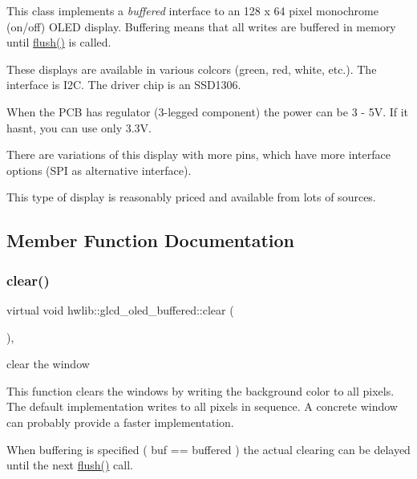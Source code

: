 This class implements a {\itshape buffered} interface to an 128 x 64 pixel monochrome (on/off) O\+L\+ED display. Buffering means that all writes are buffered in memory until \hyperlink{classhwlib_1_1glcd__oled__buffered_a68ed87e12c7f7ed0abe621b14af9d604}{flush()} is called.

These displays are available in various colcors (green, red, white, etc.). The interface is I2C. The driver chip is an S\+S\+D1306.

When the P\+CB has regulator (3-\/legged component) the power can be 3 -\/ 5V. If it hasn\textquotesingle{}t, you can use only 3.\+3V.

There are variations of this display with more pins, which have more interface options (S\+PI as alternative interface).

This type of display is reasonably priced and available from lots of sources. 

\subsection{Member Function Documentation}
\mbox{\label{classhwlib_1_1glcd__oled__buffered_a1df3ca6d163e33b2edf1242acf47342a}} 
\subsubsection{\texorpdfstring{clear()}{clear()}}
{\footnotesize\ttfamily virtual void hwlib\+::glcd\+\_\+oled\+\_\+buffered\+::clear (\begin{DoxyParamCaption}{ }\end{DoxyParamCaption})\hspace{0.3cm}{\ttfamily [inline]}, {\ttfamily [virtual]}}



clear the window 

This function clears the windows by writing the background color to all pixels. The default implementation writes to all pixels in sequence. A concrete window can probably provide a faster implementation.

When buffering is specified ( buf == buffered ) the actual clearing can be delayed until the next \hyperlink{classhwlib_1_1glcd__oled__buffered_a68ed87e12c7f7ed0abe621b14af9d604}{flush()} call. 

